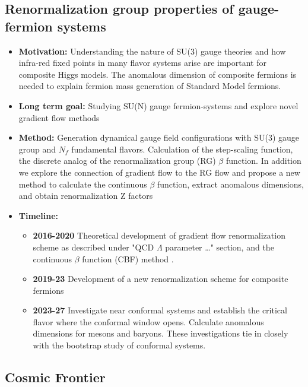 \documentclass[12pt,hyperpdf]{article}
\begin{document}
\subsection{Renormalization group properties of gauge-fermion systems }
\begin{itemize}
    \item { \bf Motivation:}
     Understanding the nature of SU(3) gauge theories and how infra-red
     fixed points in many flavor systems arise are important for composite Higgs models. The anomalous dimension of composite fermions is needed to explain fermion mass generation of Standard Model fermions.  
    \item {\bf Long term goal:} Studying SU(N) gauge fermion-systems and explore novel gradient flow methods
    \item {\bf Method:}  Generation dynamical gauge field configurations with
     SU(3) gauge group and $N_f$ fundamental flavors. Calculation of
     the step-scaling function, the discrete analog of the
     renormalization group (RG) $\beta$ function. In addition we
     explore the connection of gradient flow to the RG flow and propose
     a new method to calculate the continuous $\beta$ function,
     extract anomalous dimensions, and obtain renormalization Z factors
    \item {\bf Timeline:}
\begin{itemize}
    \item{\bf 2016-2020} Theoretical development of gradient flow renormalization scheme as described under "QCD $\Lambda$ parameter \dots " section, and  the continuous $\beta$ function (CBF) method \cite{Fodor:2017die,Hasenfratz:2019hpg}.
    \item{\bf 2019-23} Development of a new renormalization scheme for composite fermions \cite{Hasenfratz:2022wll}
    \item{\bf 2023-27} Investigate near conformal systems and establish the critical flavor where the conformal window opens. Calculate anomalous dimensions for mesons and baryons. These investigations tie in closely with the bootstrap study of conformal systems. 
\end{itemize}
\end{itemize}




\subsection{Cosmic Frontier}
\end{document}
